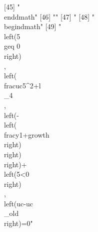  [45] "\\end{dmath}"                                                                                                                                                                                                                                                                                                                                                                                                                                                                                
 [46] ""                                                                                                                                                                                                                                                                                                                                                                                                                                                                                            
 [47] "%
 [48] "\\begin{dmath}"                                                                                                                                                                                                                                                                                                                                                                                                                                                                              
 [49] "\\left(5\\geq 0\\right)\\, \\left(\\frac{{uc}}{5^{2}}+{{l\\_4}}\\, \\left(-\\left(\\frac{{y}}{1+{growth}}\\right)\\right)\\right)+\\left(5<0\\right)\\, \\left({uc}-{{uc\\_old}}\\right)=0"                                                                                                                                                                                                                                                                                                  
